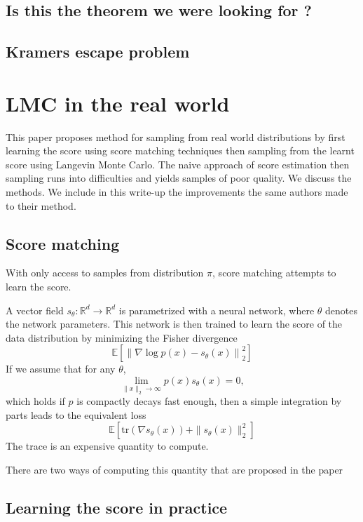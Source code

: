 \documentclass[11pt,twoside]{article}
\newcommand{\E}{\mathbb{E}}
\newcommand{\R}{\mathbb{R}}
\begin{document}
\subsection{Is this the theorem we were looking for ?}

\subsection{Kramers escape problem}

\section{LMC in the real world}

This paper proposes method for sampling from real world distributions by first learning the score using score matching techniques then sampling from the learnt score using Langevin Monte Carlo. The naive approach of score estimation then sampling runs into difficulties and yields samples of poor quality. We discuss the methods. We include in this write-up the improvements the same authors made to their method.

\subsection{Score matching}

With only access to samples from distribution $\pi$, score matching attempts to learn the score. 

A vector field $s_\theta: \R^d \rightarrow \R^d$ is parametrized with a neural network, where $\theta$ denotes the network parameters. This network is then trained to learn the score of the data distribution by minimizing the Fisher divergence 
\[
\E \left[ \left\| \nabla \log p(x) - s_\theta(x) \right\|_2^2\right]
\]
If we assume that for any $\theta$,
\[
\lim_{\|x\|_2 \rightarrow \infty} p(x)s_\theta(x) =0,
\]
which holds if $p$ is compactly decays fast enough, then a simple integration by parts leads to the equivalent loss
\[
\E \left[ \text{tr}(\nabla s_\theta(x)) + \|s_\theta(x)\|_2^2\right]
\]
The trace is an expensive quantity to compute.

There are two ways of computing this quantity that are proposed in the paper

\subsection{Learning the score in practice}
\end{document}
